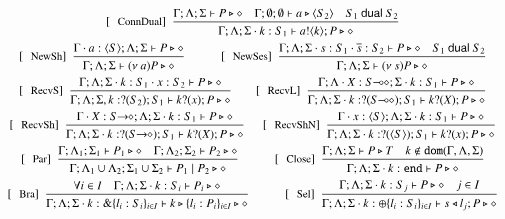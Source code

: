 \begin{figure}[!t]
\[\begin{array}{c}
		\trule{ConnDual}~~\tree{
			\Gamma; \Lambda; \Sigma \proves P \hastype \Proc  \quad \Gamma; \emptyset; \emptyset \proves a \hastype \chtype{S_2} \quad S_1 \dualof S_2
		}{
			\Gamma; \Lambda; \Sigma \cat k: S_1  \proves \bout{a}{k} P \hastype \Proc
		}

		\\[4mm]

		\trule{NewSh}~~\tree{
			\Gamma\cat a:\chtype{S} ; \Lambda; \Sigma \proves P \hastype \Proc
		}{
			\Gamma; \Lambda; \Sigma \proves \news{a} P \hastype \Proc}
		\qquad\quad
		\trule{NewSes}~~\tree{
			\Gamma; \Lambda; \Sigma \cat s:S_1 \cat \dual{s}: S_2 \proves P \hastype \Proc \quad S_1 \dualof S_2
		}{
			\Gamma; \Lambda; \Sigma \proves \news{s} P \hastype \Proc
		}
		\\[4mm]

		\trule{RecvS}~~\tree{
			\Gamma; \Lambda; \Sigma \cat k: S_1 \cat x: S_2 \proves P \hastype \Proc
		}{
			\Gamma; \Lambda; \Sigma, k: \btinp{S_2} S_1  \vdash \binp{k}{x}P \hastype \Proc
		}
		\quad\quad 
		\trule{RecvL}~~\tree{
			\Gamma; \Lambda \cat X: \lhot{S}; \Sigma \cat k: S_1  \proves P \hastype \Proc
		}{
			\Gamma; \Lambda; \Sigma \cat k:\btinp{\lhot{S}}S_1  \proves \binp{k}{X}P \hastype \Proc
		}
		\\[4mm]

		\trule{RecvSh}~~\tree{
			\Gamma \cat X: \shot{S}; \Lambda; \Sigma \cat k: S_1  \proves P \hastype \Proc
		}{
			\Gamma; \Lambda; \Sigma \cat k:\btinp{\shot{S}}S_1  \proves \binp{k}{X}P \hastype \Proc
		}
		\quad ~~
		\trule{RecvShN}~~\tree{
			\Gamma \cat x: \chtype{S}; \Lambda; \Sigma \cat k: S_1  \proves P \hastype \Proc
		}{
			\Gamma; \Lambda; \Sigma \cat k:\btinp{\chtype{S}}S_1  \proves \binp{k}{x}P \hastype \Proc
		}
		\\[4mm]
		\trule{Par}~~\tree{
			\Gamma; \Lambda_{1}; \Sigma_{1} \proves P_{1} \hastype \Proc \quad \Gamma; \Lambda_{2}; \Sigma_{2} \proves P_{2} \hastype \Proc
		}{
			\Gamma; \Lambda_{1} \cup \Lambda_2; \Sigma_{1} \cup \Sigma_2 \proves P_1 \Par P_2 \hastype \Proc
		}
		\qquad\quad
		\trule{Close}~~\tree{
			\Gamma; \Lambda; \Sigma  \proves P \hastype T \quad k \not\in \dom{\Gamma, \Lambda,\Sigma}
		}{
			\Gamma; \Lambda; \Sigma \cat k: \tinact  \proves P \hastype \Proc
		}
		\\[4mm]
		\trule{Bra}~~\tree{
			 \forall i \in I \quad \Gamma; \Lambda; \Sigma \cat k:S_i \proves P_i \hastype \Proc
		}{
			\Gamma; \Lambda; \Sigma \cat k: \btbra{l_i:S_i}_{i \in I} \proves \bbra{k}{l_i:P_i}_{i \in I}\hastype \Proc
		}
		\qquad\quad 
	 	\trule{Sel}~~\tree{
			\Gamma; \Lambda; \Sigma \cat k: S_j  \proves P \hastype \Proc \quad j \in I
		}{
			\Gamma; \Lambda; \Sigma \cat k:\btsel{l_i:S_i}_{i \in I} \proves \bsel{s}{l_j} P \hastype \Proc
		}
		\\[4mm]


\end{array}\]
\end{figure}
